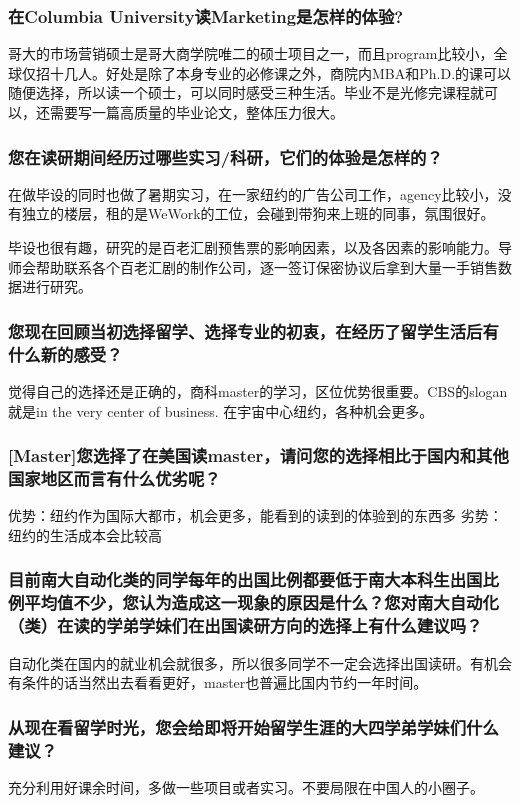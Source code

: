 \documentclass[a4paper,UTF8]{book}
\begin{document}
    \subsubsection*{在Columbia University读Marketing是怎样的体验?}
    哥大的市场营销硕士是哥大商学院唯二的硕士项目之一，而且program比较小，全球仅招十几人。好处是除了本身专业的必修课之外，商院内MBA和Ph.D.的课可以随便选择，所以读一个硕士，可以同时感受三种生活。毕业不是光修完课程就可以，还需要写一篇高质量的毕业论文，整体压力很大。
    \subsubsection*{您在读研期间经历过哪些实习/科研，它们的体验是怎样的？}
    在做毕设的同时也做了暑期实习，在一家纽约的广告公司工作，agency比较小，没有独立的楼层，租的是WeWork的工位，会碰到带狗来上班的同事，氛围很好。

    毕设也很有趣，研究的是百老汇剧预售票的影响因素，以及各因素的影响能力。导师会帮助联系各个百老汇剧的制作公司，逐一签订保密协议后拿到大量一手销售数据进行研究。
    \subsubsection*{您现在回顾当初选择留学、选择专业的初衷，在经历了留学生活后有什么新的感受？}
    觉得自己的选择还是正确的，商科master的学习，区位优势很重要。CBS的slogan就是in the very center of business.  在宇宙中心纽约，各种机会更多。 
    \subsubsection*{[Master]您选择了在美国读master，请问您的选择相比于国内和其他国家地区而言有什么优劣呢？}
    优势：纽约作为国际大都市，机会更多，能看到的读到的体验到的东西多
    劣势：纽约的生活成本会比较高
    \subsubsection*{目前南大自动化类的同学每年的出国比例都要低于南大本科生出国比例平均值不少，您认为造成这一现象的原因是什么？您对南大自动化（类）在读的学弟学妹们在出国读研方向的选择上有什么建议吗？}
    自动化类在国内的就业机会就很多，所以很多同学不一定会选择出国读研。有机会有条件的话当然出去看看更好，master也普遍比国内节约一年时间。
    \subsubsection*{从现在看留学时光，您会给即将开始留学生涯的大四学弟学妹们什么建议？}
    充分利用好课余时间，多做一些项目或者实习。不要局限在中国人的小圈子。
\end{document}

